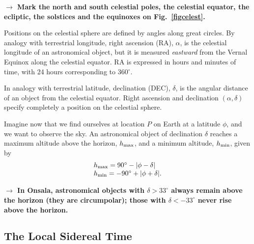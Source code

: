 \medskip
{\bf{$\rightarrow$ Mark the north and south celestial poles, 
the celestial equator, the ecliptic,
the solstices and the equinoxes on Fig.~\ref{figcelest}.}}
\medskip

Positions on the celestial sphere are defined by angles along 
great circles. By analogy with terrestrial longitude, 
right ascension (RA), $\alpha$, is the celestial longitude of an
astronomical object, 
but it is measured {\em eastward} from the Vernal Equinox
along the celestial equator. RA is expressed
in hours and minutes of time, with 24 hours corresponding 
to 360$^\circ$. 

In analogy with terrestrial latitude, declination (DEC), $\delta$, 
is the angular distance of an object from the celestial equator. 
Right ascension and declination $(\alpha,\delta)$ specify completely
a position on the celestial sphere. 

Imagine now that we find ourselves at location $P$ on Earth at a 
latitude $\phi$, and we want to observe the sky. 
An astronomical object
of declination $\delta$ reaches a maximum altitude above
the horizon, $h_{\rm max}$, and a minimum altitude, $h_{\rm min}$,
given by
\begin{equation}
\begin{array}{l}
h_{\rm max} = 90^\circ -|\phi-\delta| \\
h_{\rm min} = -90^\circ +|\phi+\delta|. 
\end{array}
\end{equation}

{\bf{$\rightarrow$ In Onsala, astronomical objects with $\delta > 33^\circ$
always remain above the horizon (they are circumpolar); those with $\delta <
-33^\circ$ never rise above the horizon.}}


\subsection{The Local Sidereal Time}


